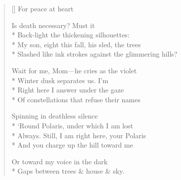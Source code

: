 \label{ch:snow_globe}
\settowidth{\versewidth}{                                      For peace at heart}
\begin{verse}[\versewidth]
                                      For peace at heart

Is death necessary?  Must it\\*
Back-light the thickening silhouettes:\\*
My son, eight this fall, his sled, the trees\\*
Slashed like ink strokes against the glimmering hills?

Wait for me, Mom---he cries as the violet\\*
Winter dusk separates us.  I'm \\*
Right here I answer   under the gaze\\*
Of constellations that refuse their names

Spinning in deathless silence\\*
`Round Polaris, under which I am lost\\*
Always.  Still, I am right here, your Polaris\\*
And you charge up the hill toward me

Or toward my voice in the dark\\*
Gaps between trees \& house \& sky.
\end{verse}
